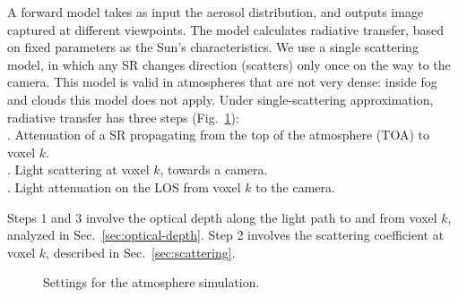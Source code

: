 \documentclass[10pt,twocolumn,letterpaper]{article}
\newcommand{\yoavcomment}[1]{}
\renewcommand{\yoavcomment}[1]{#1} %
\begin{document}
A forward model takes as input the aerosol distribution, and outputs image captured at different viewpoints. The model calculates radiative transfer, based on fixed parameters as the Sun's characteristics. We use a single scattering model, in which any SR changes direction (scatters) only once on the way to the camera. This model is valid in atmospheres that are not very dense: inside fog and clouds this model does not apply. Under single-scattering approximation, radiative transfer has three steps (Fig.~\ref{fig:settings}):\\

\vspace{-0.35cm}
. Attenuation of a SR propagating from the top of the atmosphere
  (TOA) to voxel $k$. \\

\vspace{-0.35cm}
. Light scattering at voxel $k$, towards a camera.\\

\vspace{-0.35cm}
. Light attenuation on the LOS from voxel $k$ to the camera.

\noindent
Steps 1 and 3 involve the optical depth
along the light path to and from voxel $k$, analyzed in Sec.~\ref{sec:optical-depth}.
Step 2 involves the scattering coefficient at voxel $k$,
described in Sec.~\ref{sec:scattering}.


\begin{figure}
  \centering {}
  \yoavcomment{}
  \caption[Settings of the atmosphere simulation]{Settings for the
    atmosphere simulation.}
  \label{fig:settings}
\end{figure}
\end{document}
